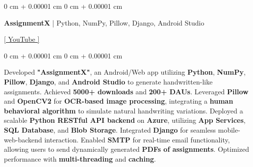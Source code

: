 \documentclass[10pt, letterpaper]{article}
\newenvironment{highlights}{
    \begin{itemize}[
        topsep=0.10 cm,
        parsep=0.10 cm,
        partopsep=0pt,
        itemsep=0pt,
        leftmargin=0 cm + 10pt
    ]
}{
    \end{itemize}
} %
\newenvironment{onecolentry}{
    \begin{adjustwidth}{
        0 cm + 0.00001 cm
    }{
        0 cm + 0.00001 cm
    }
}{
    \end{adjustwidth}
} %
\newenvironment{twocolentry}[2][]{
    \onecolentry
    \def\secondColumn{#2}
    \setcolumnwidth{\fill, 4.5 cm}
    \begin{paracol}{2}
}{
    \switchcolumn \raggedleft \secondColumn
    \end{paracol}
    \endonecolentry
} %
\begin{document}
        \begin{twocolentry}{
            \href{https://www.youtube.com/watch?v=HVPswAjoL8c}{[ YouTube ]}
        }
            \textbf{AssignmentX} | Python, NumPy, Pillow, Django, Android Studio
        \end{twocolentry}
        \begin{onecolentry}
            \begin{highlights}
                Developed \textbf{"AssignmentX"}, an Android/Web app utilizing \textbf{Python}, \textbf{NumPy}, \textbf{Pillow}, \textbf{Django}, and \textbf{Android Studio} to generate handwritten-like assignments. Achieved \textbf{5000+ downloads} and \textbf{200+ DAUs}. Leveraged \textbf{Pillow} and \textbf{OpenCV2} for \textbf{OCR-based image processing}, integrating a \textbf{human behavioral algorithm} to simulate natural handwriting variations. Deployed a scalable \textbf{Python RESTful API backend} on \textbf{Azure}, utilizing \textbf{App Services}, \textbf{SQL Database}, and \textbf{Blob Storage}. Integrated \textbf{Django} for seamless mobile-web-backend interaction. Enabled \textbf{SMTP} for real-time email functionality, allowing users to send dynamically generated \textbf{PDFs of assignments}. Optimized performance with \textbf{multi-threading} and \textbf{caching}.
            \end{highlights}
        \end{onecolentry}
        

    
\end{document}
